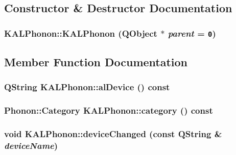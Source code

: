 \subsection{Constructor \& Destructor Documentation}
\hypertarget{class_k_a_l_phonon_53e58c6459b6ddafc2ecaea52ad72168}{
\subsubsection[{KALPhonon}]{\setlength{\rightskip}{0pt plus 5cm}KALPhonon::KALPhonon (QObject $\ast$ {\em parent} = {\tt 0})}}
\label{class_k_a_l_phonon_53e58c6459b6ddafc2ecaea52ad72168}




\subsection{Member Function Documentation}
\hypertarget{class_k_a_l_phonon_9177f057918193079d7e65394191d7e7}{
\subsubsection[{alDevice}]{\setlength{\rightskip}{0pt plus 5cm}QString KALPhonon::alDevice () const}}
\label{class_k_a_l_phonon_9177f057918193079d7e65394191d7e7}


\hypertarget{class_k_a_l_phonon_06a761e1d2ee5e9167eae70d87f6ebd3}{
\subsubsection[{category}]{\setlength{\rightskip}{0pt plus 5cm}Phonon::Category KALPhonon::category () const}}
\label{class_k_a_l_phonon_06a761e1d2ee5e9167eae70d87f6ebd3}


\hypertarget{class_k_a_l_phonon_0f2beec9824c6d1a152175d0ee7054ef}{
\subsubsection[{deviceChanged}]{\setlength{\rightskip}{0pt plus 5cm}void KALPhonon::deviceChanged (const QString \& {\em deviceName})}}
\label{class_k_a_l_phonon_0f2beec9824c6d1a152175d0ee7054ef}


